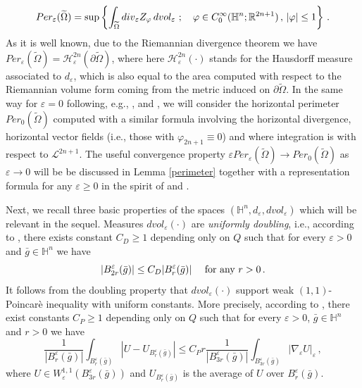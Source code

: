 \documentclass[10pt]{amsart}
\numberwithin{equation}{section}
\theoremstyle{definition}
\newcommand{\eps}{\varepsilon}
\newcommand{\He}{\mathbb{H}}
\begin{document}
\[ Per_\varepsilon (\widetilde{\Omega})= \sup \left\{  \int_{\widetilde{\Omega}}  {\rm div}_{\eps} Z_\varphi \, d vol_\varepsilon \, \, ; \quad \varphi \in C_0^\infty(\He^n ; \mathbb{R}^{2n+1} ) \, , \, |\varphi| \leq 1 \right\} \, . \]
\noindent As it is well known, due to the Riemannian divergence theorem we have $Per_\varepsilon(\widetilde{\Omega})=\mathcal{H}^{2n}_\varepsilon(\partial \widetilde{\Omega})$, where here $\mathcal{H}^{2n}_\varepsilon( \cdot )$ stands for the Hausdorff measure associated to $d_\varepsilon$, which is also equal to the area computed with respect to the Riemannian volume form coming from the metric induced on $\partial \widetilde{\Omega}$. 
In the same way for $\varepsilon=0$ following, e.g., \cite{CapDanGar2}, \cite{MonSeCa} and \cite{FraSeSeCa}, we will consider the horizontal perimeter $Per_0(\widetilde{\Omega})$ computed with a similar formula involving the horizontal divergence, horizontal vector fields (i.e., those with $\varphi_{2n+1} \equiv 0$) and where integration is with respect to $\mathcal{L}^{2n+1}$. The useful convergence property $\varepsilon Per_\varepsilon(\widetilde{\Omega}) \to Per_0(\widetilde{\Omega}) $ as $\varepsilon \to 0$ will be be discussed in Lemma \ref{perimeter} together with a representation formula for any $\varepsilon \geq 0$ in the spirit of \cite[Section 3]{CapDanGar2} and \cite[Section 5]{MonSeCa}. 

Next, we recall three basic properties of the spaces $(\He^n, d_\varepsilon, d vol_\varepsilon)$ which will be relevant in the sequel. Measures $d vol_\varepsilon(\cdot)$ are {\em uniformly doubling}, i.e., according to \cite[Theorem 3.6]{DoMaRi}, there exists constant $C_D \geq 1$ depending only on $Q$ such that for every $\varepsilon >0$ and $\bar{g} \in  \He^n$ we have
\begin{equation}
\label{doublingproperty}
	|B^\varepsilon_{2r}(\bar{g})| \leq C_D |B^\varepsilon_{r}(\bar{g})| \quad \hbox{ for any } r>0 \, .
\end{equation}
It follows from the doubling property that $ dvol_\varepsilon(\cdot)$ support weak $(1,1)$-Poincar\`e inequality with uniform constants. More precisely, according to \cite[Theorem 4.2]{DoMaRi}, there exist constants $C_P \geq 1$ depending only on $Q$ such that for every $\varepsilon >0$, $\bar{g} \in  \He^n$ and $r>0$ we have
\begin{equation}
\label{unifpoincare}
\frac{1}{|B^\varepsilon_r(\bar{g})|}\int_{B^\varepsilon_r(\bar{g})} |U- U_{B^\varepsilon_r(\bar{g})}| \leq C_P r  \frac{1}{|B^\varepsilon_{3r}(\bar{g})|} \int_{B^\varepsilon_{3r}(\bar{g})} | \nabla_\varepsilon U |_\varepsilon  \, ,  
\end{equation}
where $U \in W^{1,1}_\varepsilon( B^\varepsilon_{3r}(\bar{g}))$ and $U_{B^\varepsilon_r(\bar{g})}$ is the average of $U$ over $B^\varepsilon_r(\bar{g})$.
\end{document}
